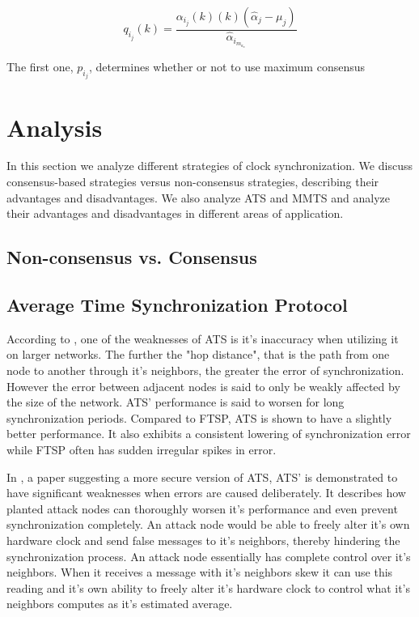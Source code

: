 \documentclass[a4paper,12pt]{article}
\begin{document}
    \begin{equation}
        q_i_j(k) = \frac{\alpha_i_j(k) (k) (\hat{\alpha}_j - \mu_j)}{\hat{\alpha}_i_m_a_x}
    \end{equation}
    
    The first one, $p_i_j$, determines whether or not to use maximum consensus
    
    

\section{Analysis}

In this section we analyze different strategies of clock synchronization. We discuss consensus-based strategies versus non-consensus strategies, describing their advantages and disadvantages. We also analyze ATS and MMTS and analyze their advantages and disadvantages in different areas of application.

\subsection{Non-consensus vs. Consensus}


\subsection{Average Time Synchronization Protocol}
According to \citet{SchenatoFiorentin11}, one of the weaknesses of ATS is it's inaccuracy when utilizing it on larger networks. The further the "hop distance", that is the path from one node to another through it's neighbors, the greater the error of synchronization. However the error between adjacent nodes is said to only be weakly affected by the size of the network. ATS' performance is said to worsen for long synchronization periods. Compared to FTSP, ATS is shown to have a slightly better performance. It also exhibits a consistent lowering of synchronization error while FTSP often has sudden irregular spikes in error.


In \citet{HeChengShiChen13}, a paper suggesting a more secure version of ATS, ATS' is demonstrated to have significant weaknesses when errors are caused deliberately. It describes how planted attack nodes can thoroughly worsen it's performance and even prevent synchronization completely. An attack node would be able to freely alter it's own hardware clock and send false messages to it's neighbors, thereby hindering the synchronization process. An attack node essentially has complete control over it's neighbors. When it receives a message with it's neighbors skew it can use this reading and it's own ability to freely alter it's hardware clock to control what it's neighbors computes as it's estimated average.
\end{document}
